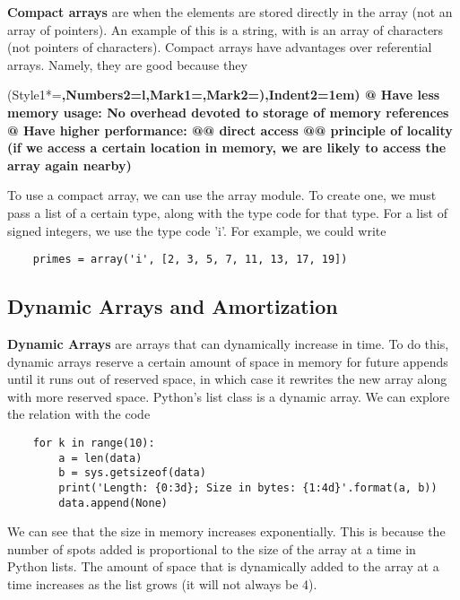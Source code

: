 \documentclass[]{article}
\begin{document}
\textbf{Compact arrays} are when the elements are stored directly in the array (not an array of pointers). An example of this is a string, with is an array of characters (not pointers of characters). Compact arrays have advantages over referential arrays. Namely, they are good because they\\

\begin{easylist}
	\ListProperties(Style1*=\bfseries,Numbers2=l,Mark1={},Mark2={)},Indent2=1em)
	@ Have less memory usage: No overhead devoted to storage of memory references
	@ Have higher performance:
	@@ direct access
	@@ principle of locality (if we access a certain location in memory, we are likely to access the array again nearby)
\end{easylist}\bigbreak

To use a compact array, we can use the array module. To create one, we must pass a list of a certain type, along with the type code for that type. For a list of signed integers, we use the type code 'i'. For example, we could write

\begin{lstlisting}
	primes = array('i', [2, 3, 5, 7, 11, 13, 17, 19])
\end{lstlisting}\bigbreak

\subsection{Dynamic Arrays and Amortization}\bigbreak

\textbf{Dynamic Arrays} are arrays that can dynamically increase in time. To do this, dynamic arrays reserve a certain amount of space in memory for future appends until it runs out of reserved space, in which case it rewrites the new array along with more reserved space. Python's list class is a dynamic array. We can explore the relation with the code

\begin{lstlisting}
	for k in range(10):
		a = len(data)
		b = sys.getsizeof(data)
		print('Length: {0:3d}; Size in bytes: {1:4d}'.format(a, b))
		data.append(None)
\end{lstlisting}\bigbreak

We can see that the size in memory increases exponentially. This is because the number of spots added is proportional to the size of the array at a time in Python lists. The amount of space that is dynamically added to the array at a time increases as the list grows (it will not always be 4).\\
\end{document}
